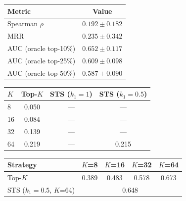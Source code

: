 \begin{tabular}{lc}
\toprule
Metric & Value \\
\midrule
Spearman $\rho$ & $0.192 \pm 0.182$ \\
MRR & $0.235 \pm 0.342$ \\
AUC (oracle top-10\%) & $0.652 \pm 0.117$ \\
AUC (oracle top-25\%) & $0.609 \pm 0.098$ \\
AUC (oracle top-50\%) & $0.587 \pm 0.090$ \\
\bottomrule
\end{tabular}

\begin{tabular}{lccc}
\toprule
$K$ & Top-$K$ & STS ($k_1{=}1$) & STS ($k_1{=}0.5$) \\
\midrule
8 & 0.050 & --- & --- \\
16 & 0.084 & --- & --- \\
32 & 0.139 & --- & --- \\
64 & 0.219 & --- & 0.215 \\
\bottomrule
\end{tabular}

\begin{tabular}{lcccc}
\toprule
Strategy & $K$=8 & $K$=16 & $K$=32 & $K$=64 \\
\midrule
Top-$K$ & 0.389 & 0.483 & 0.578 & 0.673 \\
STS ($k_1{=}0.5$, $K$=64) & \multicolumn{4}{c}{0.648} \\
\bottomrule
\end{tabular}
